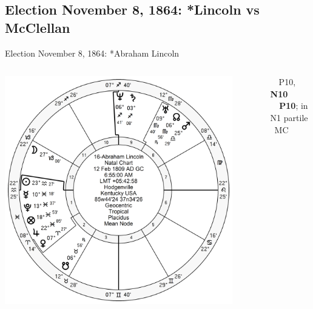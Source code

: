 \subsection{Election November 8, 1864: *Lincoln vs McClellan}
\begin{frame}[t]{Election November 8, 1864: *Abraham Lincoln}
\small
\begin{columns}[T, onlytextwidth]
\vspace{-1em}
{\includegraphics[width=0.9\textwidth]{charts/Lincoln.png}}
\fontsize{7pt}{8pt}\selectfont

\Mercury\, \Trine\, P10, \textbf{\Square\, N10} \\
\Venus\, \textbf{\Square\, P10}; in N1 partile \Trine\, MC


\end{columns}
\end{frame}
